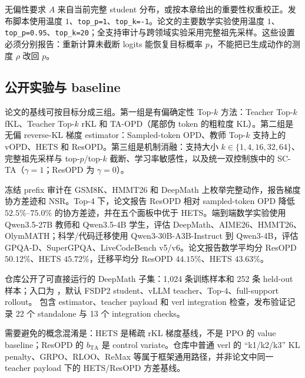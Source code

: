 无偏性要求 $A$ 来自当前完整 student 分布，或按本章给出的重要性权重校正。发布脚本使用温度 $1$、\texttt{top\_p=1}、\texttt{top\_k=-1}。论文的主要数学实验使用温度 $1$、\texttt{top\_p=0.95}、\texttt{top\_k=20}；全支持审计与跨领域实验采用完整祖先采样。这些设置必须分别报告：重新计算未截断 logits 能恢复目标概率 $p$，不能把已生成动作的测度 $\rho$ 改回 $p$。

\subsection{公开实验与 baseline}

论文的基线可按目标分成三组。第一组是有偏确定性 Top-$k$ 方法：Teacher Top-$k$ fKL、Teacher Top-$k$ rKL 和 TA-OPD（尾部伪 token 的粗粒度 KL）。第二组是无偏 reverse-KL 梯度 estimator：Sampled-token OPD、教师 Top-$k$ 支持上的 vOPD、HETS 和 ResOPD。第三组是机制消融：支持大小 $k\in\{1,4,16,32,64\}$、完整祖先采样与 top-$p$/top-$k$ 截断、学习率敏感性，以及统一双控制族中的 SC-TA（$\gamma=1$；ResOPD 为 $\gamma=0$）。

冻结 prefix 审计在 GSM8K、HMMT26 和 DeepMath 上枚举完整动作，报告梯度协方差迹和 NSR。Top-$4$ 下，论文报告 ResOPD 相对 sampled-token OPD 降低 $52.5\%$--$75.0\%$ 的协方差迹，并在五个面板中优于 HETS。端到端数学实验使用 Qwen3.5-27B 教师和 Qwen3.5-4B 学生，评估 DeepMath、AIME26、HMMT26、OlymMATH；科学/代码迁移使用 Qwen3-30B-A3B-Instruct 到 Qwen3-4B，评估 GPQA-D、SuperGPQA、LiveCodeBench v5/v6。论文报告数学平均分 ResOPD $50.12\%$、HETS $45.72\%$，迁移平均分 ResOPD $44.15\%$、HETS $43.63\%$。

仓库公开了可直接运行的 DeepMath 子集：1,024 条训练样本和 252 条 held-out 样本；入口为 ，默认 FSDP2 student、vLLM teacher、Top-$4$、full-support rollout。 包含 estimator、teacher payload 和 verl integration 检查，发布验证记录 22 个 standalone 与 13 个 integration checks。

需要避免的概念混淆是：HETS 是稀疏 rKL 梯度基线，不是 PPO 的 value baseline；ResOPD 的 $b_{\mathrm{TA}}$ 是 control variate。仓库中普通 verl 的 ``k1/k2/k3'' KL penalty、GRPO、RLOO、ReMax 等属于框架通用路径，并非论文中同一 teacher payload 下的 HETS/ResOPD 方差基线。
